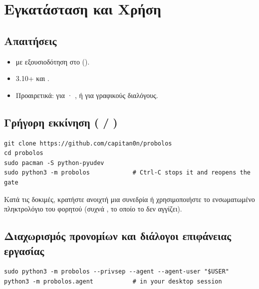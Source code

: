 \chapter{Εγκατάσταση και Χρήση}
\label{app:install}

\section{Απαιτήσεις}

\begin{itemize}
  \item {} με εξουσιοδότηση  στο 
        ().
  \item {} 3.10+ και .
  \item Προαιρετικά:  για · ,
         ή  για γραφικούς διαλόγους.
\end{itemize}

\section{Γρήγορη εκκίνηση ( / )}

\begin{lstlisting}[language=shell,caption={Εκτέλεση από τον πηγαίο κώδικα.}]
git clone https://github.com/capitan0n/probolos
cd probolos
sudo pacman -S python-pyudev
sudo python3 -m probolos            # Ctrl-C stops it and reopens the gate
\end{lstlisting}

\begin{warnbox}
Κατά τις δοκιμές, κρατήστε ανοιχτή μια συνεδρία  ή χρησιμοποιήστε το
ενσωματωμένο πληκτρολόγιο του φορητού (συχνά , το οποίο το \Probolos{}
δεν αγγίζει).
\end{warnbox}

\section{Διαχωρισμός προνομίων και διάλογοι επιφάνειας εργασίας}

\begin{lstlisting}[language=shell,caption={Εκτέλεση με \code{--privsep} και πράκτορα.}]
sudo python3 -m probolos --privsep --agent --agent-user "$USER"
python3 -m probolos.agent           # in your desktop session
\end{lstlisting}

